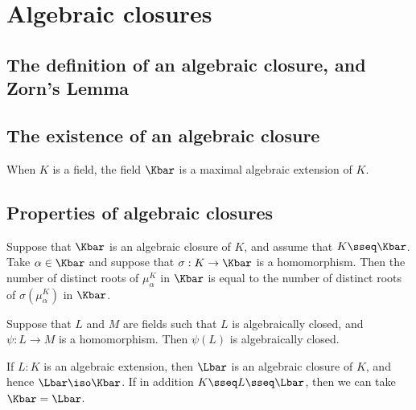 \documentclass[a4paper]{article}
\begin{document}
\section{Algebraic closures}
\subsection{The definition of an algebraic closure, and Zorn's Lemma}

\subsection{The existence of an algebraic closure}

\begin{tcorollary}
  When \( K \) is a field, the field \( \Kbar \) is a maximal algebraic extension of \( K \).
\end{tcorollary}

\subsection{Properties of algebraic closures}

\begin{tcorollary}
  Suppose that \( \Kbar \) is an algebraic closure of \( K \), and assume that \( K\sseq \Kbar \).
  Take \( \alpha\in \Kbar \) and suppose that \( \sigma:K\to \Kbar \) is a homomorphism.
  Then the number of distinct roots of \( \mu_\alpha^K \) in \( \Kbar \) is equal to the number of distinct roots of \( \sigma(\mu_\alpha^K) \) in \( \Kbar \).
\end{tcorollary}

\begin{tproposition}
  Suppose that \( L \) and \( M \) are fields such that \( L \) is algebraically closed, and \( \psi : L \to M \) is a homomorphism.
  Then \( \psi(L) \) is algebraically closed.
\end{tproposition}

\begin{tproposition}
  If \( L:K \) is an algebraic extension, then \( \Lbar \) is an algebraic closure of \( K \), and hence \( \Lbar\iso\Kbar \).
  If in addition \( K\sseq L\sseq \Lbar \), then we can take \( \Kbar = \Lbar \).
\end{tproposition}
\end{document}
